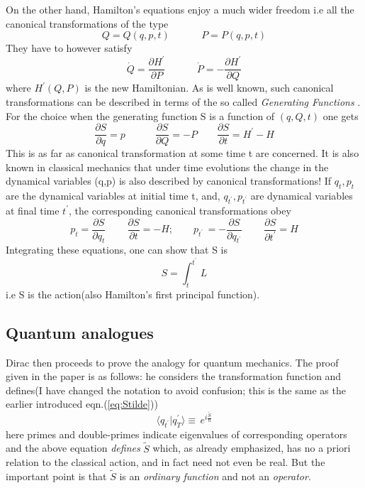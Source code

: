 \documentclass[12pt]{article}
\newcommand{\be}{\begin{equation}}
\newcommand{\ee}{\end{equation}}
\begin{document}
On the other hand, Hamilton's equations enjoy a much wider freedom i.e all the canonical transformations of the type
\be
\label{eq:canonical2}
Q = Q(q,p,t)\quad\quad\quad\,P = P(q,p,t)
\ee
They have to however satisfy
\be
\label{eq:canonical3}
{\dot Q} = \frac{\partial H^\prime}{\partial P}\quad\quad\quad\,{\dot P} = -\frac{\partial H^\prime}{\partial Q}
\ee
where $H^\prime(Q,P)$ is the new Hamiltonian. As is well known, such canonical transformations can be described in terms of the so called
{\it Generating Functions} \cite{landau}. For the choice when the generating function S is a function of $(q,Q,t)$ one gets
\be\label{eq: generating}
\frac{\partial S}{\partial q} = p\quad\quad\quad \frac{\partial S}{\partial Q} = - P\quad\quad \frac{\partial S}{\partial t} = H^\prime - H
\ee
This is as far as canonical transformation at some time t are concerned. It is also known in classical mechanics that under time evolutions
the change in the dynamical variables (q,p) is also described by canonical transformations! If $q_t,p_t$ are the dynamical
variables at initial time t, and, $q_{t^\prime},p_{t^\prime}$ are dynamical variables at final time $t^\prime$, the corresponding
canonical transformations obey
\be
\label{eq:canonicalevol}
p_t = \frac{\partial S}{\partial q_t}\quad\quad\,\frac{\partial S}{\partial t} = - H;\quad\quad p_{t^\prime}\,
= - \frac{\partial S}{\partial q_{t^\prime}}\quad\quad\,\frac{\partial S}{\partial t^\prime} = H
\ee
Integrating these equations, one can show that S is
\be
\label{eq:principal}
S = \int_t^{t^\prime}\,L 
\ee
i.e S is the action(also Hamilton's first principal function).

\subsection{Quantum analogues}
Dirac then proceeds to prove the analogy for quantum mechanics. The proof given in the paper \cite{diracpaper} is as follows: he considers
the transformation function and defines(I have changed the notation to avoid confusion; this is the same as the earlier introduced 
eqn.(\ref{eq:Stilde}))
\be
\label{eq:qanalog}
\langle q_{t^\prime}|q_T^{\prime}\rangle 
\equiv\, e^{i \frac{{\tilde S}}{\hbar}}
\ee
here primes and double-primes indicate eigenvalues of corresponding operators and the above equation {\it defines} ${\tilde S}$ which,
as already emphasized, has no a priori relation to the classical action, and in fact need not even be real. But the important point is 
that ${\tilde S}$ is an
\emph{ordinary function} and not an \emph{operator}.
\end{document}
